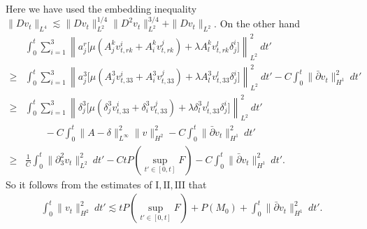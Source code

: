 \documentclass[12pt,a4paper]{amsart}
\numberwithin{equation}{section}
\theoremstyle{plain}
\theoremstyle{definition}
\newcommand{\bpartial}{\bar{\partial}}
\begin{document}
Here we have used the embedding inequality $\|Dv_t\|_{L^4}\lesssim \|Dv_t\|_{L^2}^{1/4}\|D^2v_t\|_{L^2}^{3/4}+\|Dv_t\|_{L^2}$.
On the other hand
\begin{align*}
&\int_{0}^{t}\sum\limits_{i=1}^3\left\| a^r_j\Big[\mu (A^{k}_j  v^i_{t,rk}+A^k_i  v^j_{t,rk})+\lambda A_l^k  v^l_{t,rk}\delta^i_j\Big]   \right\|_{L^2}^2 \ dt'\\
\geq &\int_{0}^{t}\sum\limits_{i=1}^3\left\| a^3_j\Big[\mu (A^3_j  v^i_{t,33}+A^3_i  v^j_{t,33})+\lambda A_l^3  v^l_{t,33}\delta^i_j\Big]   \right\|_{L^2}^2 \ dt'-C\int_{0}^{t} \|\bpartial v_t\|_{H^1}^2 \ dt'\\
\geq & \int_{0}^{t}\sum\limits_{i=1}^3\left\| \delta^3_j\Big[\mu (\delta^3_j  v^i_{t,33}+\delta^3_i  v^j_{t,33})+\lambda \delta_l^3  v^l_{t,33}\delta^i_j\Big]   \right\|_{L^2}^2 \ dt'\\
&\qquad-C\int_{0}^{t} \|A-\delta\|_{L^{\infty}}^2\|v\|_{H^2}^2-C\int_{0}^{t} \|\bpartial v_t\|_{H^1}^2 \ dt'\\
\geq & \frac{1}{C}\int_{0}^{t}\|\partial_3^2 v_t\|_{L^2}^2 \ dt'-CtP(\sup\limits_{t'\in[0,t]}F)-C\int_{0}^{t} \|\bpartial v_t\|_{H^1}^2 \ dt'.
\end{align*}
So it follows from the estimates of $\mathrm{I},\mathrm{II},\mathrm{III}$ that
\begin{equation}\label{dvtx}
\begin{aligned}
\int_{0}^{t}\| v_t\|_{H^2}^2 \ dt'\lesssim tP(\sup\limits_{t'\in[0,t]}F)+P(M_0)+\int_{0}^{t} \|\bpartial v_t\|_{H^1}^2 \ dt'.
\end{aligned}
\end{equation}

\vspace{0.3cm}
\end{document}
